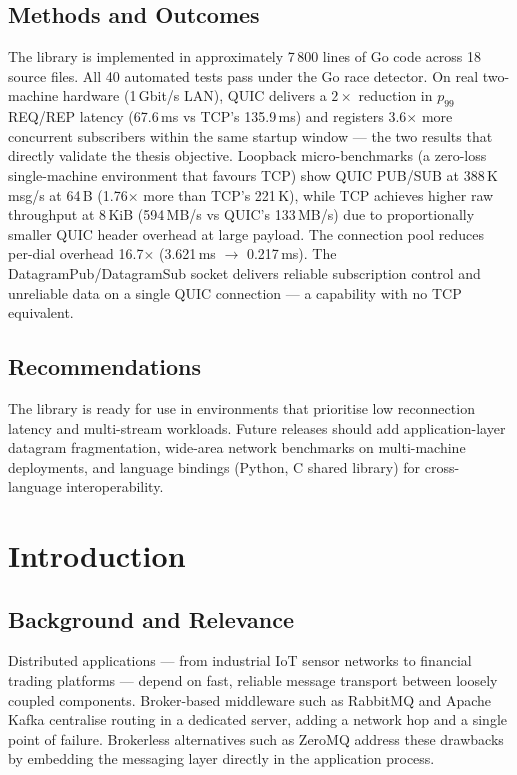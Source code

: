 \documentclass[12pt, a4paper, oneside]{report}
\begin{document}
\section{Methods and Outcomes}
\label{sec:exec-outcomes}

The library is implemented in approximately 7\,800 lines of Go code across 18 source files. All 40 automated tests pass under the Go race detector.
On real two-machine hardware (1\,Gbit/s LAN), QUIC delivers a $2{\times}$ reduction in $p_{99}$ REQ/REP latency (67.6\,ms vs TCP's 135.9\,ms) and registers 3.6$\times$ more concurrent subscribers within the same startup window — the two results that directly validate the thesis objective.
Loopback micro-benchmarks (a zero-loss single-machine environment that favours TCP) show QUIC PUB/SUB at 388\,K\,msg/s at 64\,B (1.76$\times$ more than TCP's 221\,K), while TCP achieves higher raw throughput at 8\,KiB (594\,MB/s vs QUIC's 133\,MB/s) due to proportionally smaller QUIC header overhead at large payload. The connection pool reduces per-dial overhead 16.7$\times$ (3.621\,ms $\to$ 0.217\,ms). The DatagramPub/DatagramSub socket delivers reliable subscription control and unreliable data on a single QUIC connection — a capability with no TCP equivalent.

\section{Recommendations}
\label{sec:exec-recommendations}

The library is ready for use in environments that prioritise low reconnection latency and multi-stream workloads. Future releases should add application-layer datagram fragmentation, wide-area network benchmarks on multi-machine deployments, and language bindings (Python, C shared library) for cross-language interoperability.

\chapter{Introduction}
\label{ch:intro}

\section{Background and Relevance}
\label{sec:background}

Distributed applications — from industrial IoT sensor networks to financial trading platforms — depend on fast, reliable message transport between loosely coupled components. Broker-based middleware such as RabbitMQ and Apache Kafka \cite{kafka} centralise routing in a dedicated server, adding a network hop and a single point of failure. Brokerless alternatives such as ZeroMQ \cite{zmq} address these drawbacks by embedding the messaging layer directly in the application process.
\end{document}
